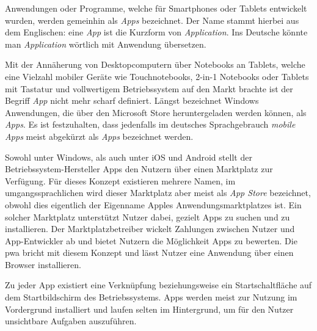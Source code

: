 Anwendungen oder Programme, welche für Smartphones oder Tablets entwickelt wurden, werden gemeinhin als \textit{Apps} bezeichnet. Der Name stammt hierbei aus dem Englischen: eine \textit{App} ist die Kurzform von \textit{Application}. Ins Deutsche könnte man \textit{Application} wörtlich mit Anwendung übersetzen.

Mit der Annäherung von Desktopcomputern über Notebooks an Tablets, welche eine Vielzahl mobiler Geräte wie Touchnotebooks, 2-in-1 Notebooks oder Tablets mit Tastatur und vollwertigem Betriebssystem auf den Markt brachte ist der Begriff \textit{App} nicht mehr scharf definiert.
Längst bezeichnet Windows Anwendungen, die über den Microsoft Store heruntergeladen werden können, als \textit{Apps}. Es ist festzuhalten, dass jedenfalls im deutsches Sprachgebrauch \textit{mobile Apps} meist abgekürzt als \textit{Apps} bezeichnet werden.

Sowohl unter Windows, als auch unter iOS und Android stellt der Betriebssystem-Hersteller Apps den Nutzern über einen Marktplatz zur Verfügung. Für dieses Konzept existieren mehrere Namen, im umgangssprachlichen wird dieser Marktplatz aber meist als \textit{App Store} bezeichnet, obwohl dies eigentlich der Eigenname Apples Anwendungsmarktplatzes ist. 
Ein solcher Marktplatz unterstützt Nutzer dabei, gezielt Apps zu suchen und zu installieren. Der Marktplatzbetreiber wickelt Zahlungen zwischen Nutzer und App-Entwickler ab und bietet Nutzern die Möglichkeit Apps zu bewerten. 
Die \acf{pwa} bricht mit diesem Konzept und lässt Nutzer eine Anwendung über einen Browser installieren. 

Zu jeder App existiert eine Verknüpfung beziehungsweise ein Startschaltfläche auf dem Startbildschirm des Betriebssystems. Apps werden meist zur Nutzung im Vordergrund installiert und laufen selten im Hintergrund, um für den Nutzer unsichtbare Aufgaben auszuführen.